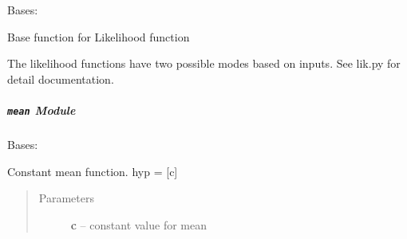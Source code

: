 \documentclass[letterpaper,10pt,english]{sphinxmanual}
\begin{document}
\begin{fulllineitems}
\label{pyGPs.Core:pyGPs.Core.lik.Likelihood}
Bases: 

Base function for Likelihood function

\begin{fulllineitems}
\label{pyGPs.Core:pyGPs.Core.lik.Likelihood.proceed}
The likelihood functions have two possible modes based on inputs. 
See lik.py for detail documentation.

\end{fulllineitems}


\end{fulllineitems}



\subparagraph{\texttt{mean} Module}
\label{pyGPs.Core:module-pyGPs.Core.mean}\label{pyGPs.Core:mean-module}

\begin{fulllineitems}
\label{pyGPs.Core:pyGPs.Core.mean.Const}
Bases: {\hyperref[pyGPs.Core:pyGPs.Core.mean.Mean]{}}

Constant mean function. hyp = {[}c{]}
\begin{quote}\begin{description}
\item[{Parameters}] \leavevmode
\textbf{c} -- constant value for mean

\end{description}\end{quote}

\begin{fulllineitems}
\label{pyGPs.Core:pyGPs.Core.mean.Const.getDerMatrix}
\end{fulllineitems}


\begin{fulllineitems}
\label{pyGPs.Core:pyGPs.Core.mean.Const.getMean}
\end{fulllineitems}


\end{fulllineitems}
\end{document}
